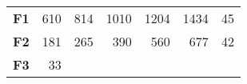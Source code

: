 \documentclass[12pt,a4paper]{article}
\begin{document}
\begin{longtable}[c]{@{}crrrrrr@{}}
\midrule
\endhead
\begin{minipage}[t]{0.11\columnwidth}\centering\strut
\textbf{F1}
\strut\end{minipage} &
\begin{minipage}[t]{0.08\columnwidth}\raggedleft\strut
610
\strut\end{minipage} &
\begin{minipage}[t]{0.08\columnwidth}\raggedleft\strut
814
\strut\end{minipage} &
\begin{minipage}[t]{0.09\columnwidth}\raggedleft\strut
1010
\strut\end{minipage} &
\begin{minipage}[t]{0.10\columnwidth}\raggedleft\strut
1204
\strut\end{minipage} &
\begin{minipage}[t]{0.11\columnwidth}\raggedleft\strut
1434
\strut\end{minipage} &
\begin{minipage}[t]{0.07\columnwidth}\raggedleft\strut
45
\strut\end{minipage}\tabularnewline
\begin{minipage}[t]{0.11\columnwidth}\centering\strut
\textbf{F2}
\strut\end{minipage} &
\begin{minipage}[t]{0.08\columnwidth}\raggedleft\strut
181
\strut\end{minipage} &
\begin{minipage}[t]{0.08\columnwidth}\raggedleft\strut
265
\strut\end{minipage} &
\begin{minipage}[t]{0.09\columnwidth}\raggedleft\strut
390
\strut\end{minipage} &
\begin{minipage}[t]{0.10\columnwidth}\raggedleft\strut
560
\strut\end{minipage} &
\begin{minipage}[t]{0.11\columnwidth}\raggedleft\strut
677
\strut\end{minipage} &
\begin{minipage}[t]{0.07\columnwidth}\raggedleft\strut
42
\strut\end{minipage}\tabularnewline
\begin{minipage}[t]{0.11\columnwidth}\centering\strut
\textbf{F3}
\strut\end{minipage} &
\begin{minipage}[t]{0.08\columnwidth}\raggedleft\strut
33
\strut\end{minipage} &

\end{longtable}
\end{document}
